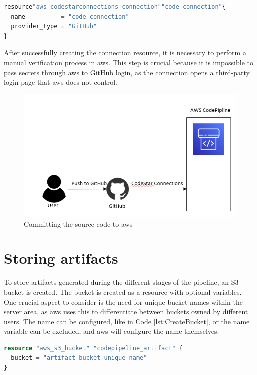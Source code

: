 \vspace{2mm}
\begin{lstlisting}[language=terraform, caption=Creation of a connection between AWS and GitHub, captionpos=b, frame=single]
resource"aws_codestarconnections_connection""code-connection"{
  name          = "code-connection"
  provider_type = "GitHub" 
}
\end{lstlisting}
\newpage
After successfully creating the connection resource, it is necessary to perform a manual verification process in \acrshort{aws}. This step is crucial because it is impossible to pass secrets through \acrshort{aws} to GitHub login, as the connection opens a third-party login page that \acrshort{aws} does not control.

\vspace{2mm}
\begin{figure}[H]
    \centering
    \includegraphics[width=0.6\columnwidth]{Images/aws-piplin-2-1.png}
    \caption{Committing the source code to \acrshort{aws}}
    \label{fig: Committing the source code to AWS}
\end{figure}

\section{Storing artifacts}
To store \gls{artifact}s generated during the different stages of the \gls{pipeline}, an S3 bucket is created. The bucket is created as a resource with optional variables. One crucial aspect to consider is the need for unique bucket names within the server area, as \acrshort{aws} uses this to differentiate between buckets owned by different users. The name can be configured, like in Code \ref{lst:CreateBucket}, or the name variable can be excluded, and \acrshort{aws} will configure the name themselves.

\vspace{2mm}
\begin{lstlisting}[language=terraform, caption=Creation of an S3 Bucket, captionpos=b, frame=single, label=lst:CreateBucket]
resource "aws_s3_bucket" "codepipeline_artifact" {
  bucket = "artifact-bucket-unique-name"
}
\end{lstlisting}


